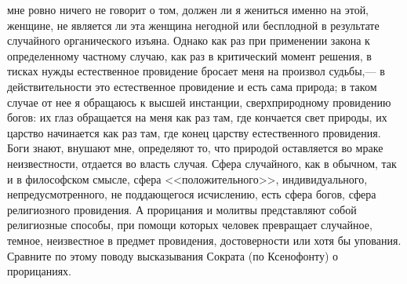 \documentclass[12pt]{article}
\begin{document}
мне ровно ничего не говорит о том, должен ли я жениться именно на этой, женщине, не является ли эта женщина негодной или бесплодной в результате случайного органического изъяна. Однако как раз при применении закона к определенному частному случаю, как раз в критический момент решения, в тисках нужды естественное провидение бросает меня на произвол судьбы,--- в действительности это естественное провидение и есть сама природа; в таком случае от нее я обращаюсь к высшей инстанции, сверхприродному провидению богов: их глаз обращается на меня как раз там, где кончается свет природы, их царство начинается как раз там, где конец царству естественного провидения. Боги знают, внушают мне, определяют то, что природой оставляется во мраке неизвестности, отдается во власть случая. Сфера случайного, как в обычном, так и в философском смысле, сфера <<положительного>>, индивидуального, непредусмотренного, не поддающегося исчислению, есть сфера богов, сфера религиозного провидения. А прорицания и молитвы представляют собой религиозные способы, при помощи которых человек превращает случайное, темное, неизвестное в предмет провидения, достоверности или хотя бы упования. Сравните по этому поводу высказывания Сократа (по Ксенофонту) о прорицаниях.



\section{}
\end{document}
